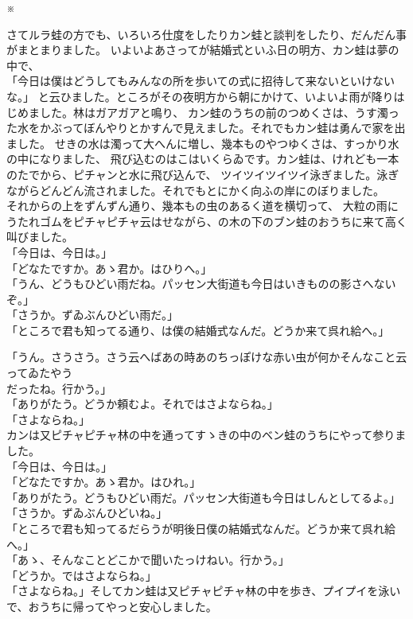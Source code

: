 \documentclass[
a4paper,
10pt,
book]
{tarticle}
\begin{document}
\newpage
\setcounter{page}{14}
\thispagestyle{fancy}
\nolinenumbers
\indent \indent \indent \indent \indent \indent \indent \indent \indent \indent ※


\indent さてルラ蛙の方でも、いろいろ仕度をしたりカン蛙と談判をしたり、だんだん事がまとまりました。
いよいよあさってが結婚式といふ日の明方、カン蛙は夢の中で、\\
「今日は僕はどうしてもみんなの所を歩いての式に招待して来ないといけないな。」
と云ひました。ところがその夜明方から朝にかけて、いよいよ雨が降りはじめました。林はガアガアと鳴り、
カン蛙のうちの前のつめくさは、うす濁った水をかぶってぼんやりとかすんで見えました。それでもカン蛙は勇んで家を出ました。
せきの水は濁って大へんに増し、幾本ものやつゆくさは、すっかり水の中になりました、
飛び込むのはこはいくらゐです。カン蛙は、けれども一本のたでから、ピチャンと水に飛び込んで、
ツイツイツイツイ泳ぎました。泳ぎながらどんどん流されました。それでもとにかく向ふの岸にのぼりました。\\
\indent それからの上をずんずん通り、幾本もの虫のあるく道を横切って、
大粒の雨にうたれゴムをピチャピチャ云はせながら、の木の下のブン蛙のおうちに来て高く叫びました。\\
「今日は、今日は。」\\
「どなたですか。あゝ君か。はひりへ。」\\
「うん、どうもひどい雨だね。パッセン大街道も今日はいきものの影さへないぞ。」\\
「さうか。ずゐぶんひどい雨だ。」\\
「ところで君も知ってる通り、は僕の結婚式なんだ。どうか来て呉れ給へ。」


\newpage
「うん。さうさう。さう云へばあの時あのちっぽけな赤い虫が何かそんなこと云ってゐたやう\\
\indent だったね。行かう。」\\
「ありがたう。どうか頼むよ。それではさよならね。」\\
「さよならね。」\\
\indent カンは又ピチャピチャ林の中を通ってすゝきの中のベン蛙のうちにやって参りました。\\
「今日は、今日は。」\\
「どなたですか。あゝ君か。はひれ。」\\
「ありがたう。どうもひどい雨だ。パッセン大街道も今日はしんとしてるよ。」\\
「さうか。ずゐぶんひどいね。」\\
「ところで君も知ってるだらうが明後日僕の結婚式なんだ。どうか来て呉れ給へ。」\\
「あゝ、そんなことどこかで聞いたっけねい。行かう。」\\
「どうか。ではさよならね。」\\
「さよならね。」そしてカン蛙は又ピチャピチャ林の中を歩き、プイプイを泳いで、おうちに帰ってやっと安心しました。\\
\end{document}

